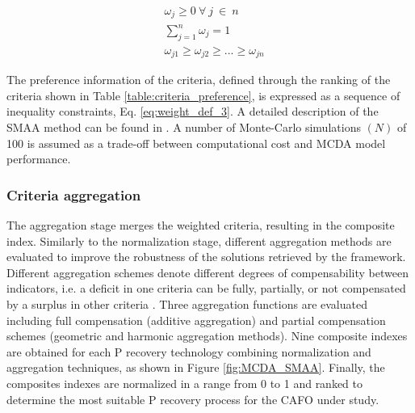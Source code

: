 \begin{refsection}[referencesCh4]
\begin{align}
& \omega_{j} \geq 0 \ \forall \ j \ \in \ {n} \label{eq:weight_def_1}\\
& \sum_{j=1}^{n} \omega_{j} = 1  \label{eq:weight_def_2} \\
%
& \omega_{j1} \geq \omega_{j2} \geq ... \geq \omega_{jn} \label{eq:weight_def_3}
\end{align}

The preference information of the criteria, defined through the ranking of the criteria shown in Table \ref{table:criteria_preference}, is expressed as a sequence of inequality constraints, Eq. \ref{eq:weight_def_3}. A detailed description of the SMAA method can be found in \citet{tervonen_implementing_2007}. A number of Monte-Carlo simulations $\left(N\right)$ of 100 is assumed as a trade-off between computational cost and MCDA model performance.

\subsubsection{Criteria aggregation}
The aggregation stage merges the weighted criteria, resulting in the composite index. 
Similarly to the normalization stage, different aggregation methods are evaluated to improve the robustness of the solutions retrieved by the framework. Different aggregation schemes denote different degrees of compensability between indicators, i.e. a deficit in one criteria can be fully, partially, or not compensated by a surplus in other criteria \citep{MarcoCinelli2020}. Three aggregation functions are evaluated including full compensation (additive aggregation) and partial compensation schemes (geometric and harmonic aggregation methods). Nine composite indexes are obtained for each P recovery technology combining normalization and aggregation techniques, as shown in Figure \ref{fig:MCDA_SMAA}.
Finally, the composites indexes are normalized in a range from 0 to 1 and ranked to determine the most suitable P recovery process for the CAFO under study.


\end{refsection}
